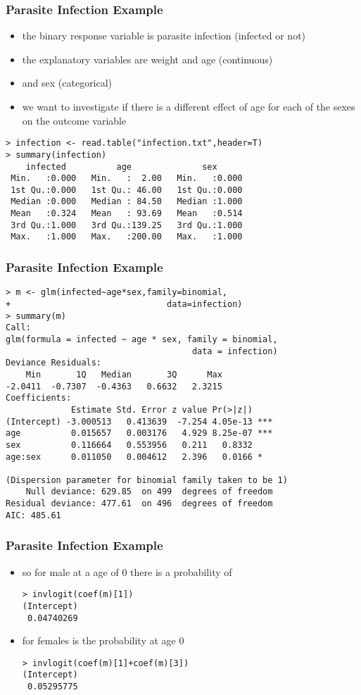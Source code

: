 \begin{frame}[fragile]\frametitle{Parasite Infection Example}
\begin{itemize}
\item the binary response variable is parasite infection (infected or not) 
\item the explanatory variables are weight and age (continuous) 
\item and sex (categorical)
\item we want to investigate if there is a different effect of age for each of the sexes on the outcome variable
\end{itemize}
\begin{verbatim}
> infection <- read.table("infection.txt",header=T)
> summary(infection)
    infected          age              sex       
 Min.   :0.000   Min.   :  2.00   Min.   :0.000  
 1st Qu.:0.000   1st Qu.: 46.00   1st Qu.:0.000  
 Median :0.000   Median : 84.50   Median :1.000  
 Mean   :0.324   Mean   : 93.69   Mean   :0.514  
 3rd Qu.:1.000   3rd Qu.:139.25   3rd Qu.:1.000  
 Max.   :1.000   Max.   :200.00   Max.   :1.000  
\end{verbatim}
\end{frame}


\begin{frame}[fragile]\frametitle{Parasite Infection Example}\footnotesize
\begin{verbatim}
> m <- glm(infected~age*sex,family=binomial,
+                               data=infection)
> summary(m)
Call:
glm(formula = infected ~ age * sex, family = binomial, 
                                     data = infection)
Deviance Residuals: 
    Min       1Q   Median       3Q      Max  
-2.0411  -0.7307  -0.4363   0.6632   2.3215  
Coefficients:
             Estimate Std. Error z value Pr(>|z|)    
(Intercept) -3.000513   0.413639  -7.254 4.05e-13 ***
age          0.015657   0.003176   4.929 8.25e-07 ***
sex          0.116664   0.553956   0.211   0.8332    
age:sex      0.011050   0.004612   2.396   0.0166 *  

(Dispersion parameter for binomial family taken to be 1)
    Null deviance: 629.85  on 499  degrees of freedom
Residual deviance: 477.61  on 496  degrees of freedom
AIC: 485.61
\end{verbatim}
\end{frame}

\begin{frame}[fragile]\frametitle{Parasite Infection Example}
\begin{itemize}
\item so for male at a age of 0 there is a probability of
\begin{verbatim}
> invlogit(coef(m)[1])
(Intercept) 
 0.04740269 
\end{verbatim}
\item for females is the probability at age 0 
\begin{verbatim}
> invlogit(coef(m)[1]+coef(m)[3])
(Intercept) 
 0.05295775 
\end{verbatim}
\end{itemize}
\end{frame}



